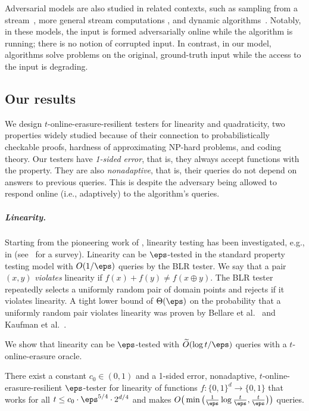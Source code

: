 \documentclass{toc}
\begin{document}
Adversarial models are also studied in related contexts, such as sampling from  a stream~\cite{Ben-EliezerY20}, more general stream computations \cite{Ben-EliezerJWY22}, and dynamic algorithms~\cite{BeimelKMNSS22}. 
Notably, in these models, the input is formed adversarially online while the algorithm is running; there is no notion of corrupted input. In contrast, in our model, algorithms solve problems on the original, ground-truth input while the access to the input is degrading. 




%
\subsection{Our results}\label{sec:results}

We design 
$t$-online-erasure-resilient testers for linearity and quadraticity, two properties widely studied because of their connection to probabilistically checkable proofs, %
hardness of approximating NP-hard problems, and coding theory. 
%
%
Our testers have {\em 1-sided error}, that is, they always accept functions with the property. They are also {\em nonadaptive}, that is, their queries do not depend on answers to previous queries. This is despite the adversary being allowed to respond online (i.e., adaptively) to the algorithm's queries.


\subparagraph*{Linearity.} 
%

Starting from the pioneering work of \cite{BlumLR93}, linearity testing has been investigated, e.g., in \cite{BellareGLR93, BellareS94, FeigeGLSS96, BellareCHKS96, BellareGS98, Trevisan98, SudanT98,  SamorodnitskyT00, HastadW03,Ben-SassonSVW03, Samorodnitsky07, SamorodnitskyT09, ShpilkaW06, KaufmanLX10} (see~\cite{RasR16} for a survey). 
%
%
%
%
Linearity can be $\eps$-tested in the standard property testing model with $O(1/\eps)$ queries by the BLR tester. We say that a pair $(x, y)$ \emph{violates} linearity if $f(x) + f(y) \neq f(x \oplus y)$. The BLR tester repeatedly selects 
%
a uniformly random pair of domain points and rejects if it violates linearity.
A tight lower bound of $\Theta(\eps)$ on the probability that a uniformly random pair violates linearity
was proven by Bellare et al.~\cite{BellareCHKS96} and Kaufman et al.~\cite{KaufmanLX10}.

We show that linearity can be $\eps$-tested with $\widetilde O(\log t/\eps)$ queries with a $t$-online-erasure oracle. 
\begin{theorem}
\label{thm:linearity_min}
There exist a constant $c_0 \in (0,1)$ and a 1-sided error, nonadaptive, $t$-online-erasure-resilient $\eps$-tester for linearity of functions $f\colon \{0,1\}^d \to \{0,1\}$ that  works for all $t \leq c_0\cdot\eps^{5/4} \cdot  2^{d/4}$ and makes $O\big(\min\big( \frac{1}{\eps}\log \frac{t}{\eps}, \frac t \eps\big)\big)$ queries.
\end{theorem}
\end{document}
